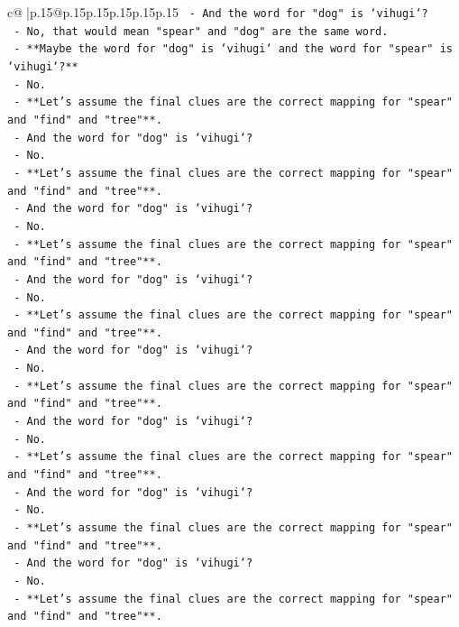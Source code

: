 \documentclass{article}
\begin{document}
{\begin{supertabular}{c@{$\;$}|p{.15\linewidth}@{}p{.15\linewidth}p{.15\linewidth}p{.15\linewidth}p{.15\linewidth}p{.15\linewidth}}
{{{\texttt{  {-} And the word for "dog" is `vihugi`?} \\
\texttt{  {-} No, that would mean "spear" and "dog" are the same word.} \\
\texttt{  {-} **Maybe the word for "dog" is `vihugi` and the word for "spear" is `vihugi`?**} \\
\texttt{  {-} No.} \\
\texttt{  {-} **Let's assume the final clues are the correct mapping for "spear" and "find" and "tree"**.} \\
\texttt{  {-} And the word for "dog" is `vihugi`?} \\
\texttt{  {-} No.} \\
\texttt{  {-} **Let's assume the final clues are the correct mapping for "spear" and "find" and "tree"**.} \\
\texttt{  {-} And the word for "dog" is `vihugi`?} \\
\texttt{  {-} No.} \\
\texttt{  {-} **Let's assume the final clues are the correct mapping for "spear" and "find" and "tree"**.} \\
\texttt{  {-} And the word for "dog" is `vihugi`?} \\
\texttt{  {-} No.} \\
\texttt{  {-} **Let's assume the final clues are the correct mapping for "spear" and "find" and "tree"**.} \\
\texttt{  {-} And the word for "dog" is `vihugi`?} \\
\texttt{  {-} No.} \\
\texttt{  {-} **Let's assume the final clues are the correct mapping for "spear" and "find" and "tree"**.} \\
\texttt{  {-} And the word for "dog" is `vihugi`?} \\
\texttt{  {-} No.} \\
\texttt{  {-} **Let's assume the final clues are the correct mapping for "spear" and "find" and "tree"**.} \\
\texttt{  {-} And the word for "dog" is `vihugi`?} \\
\texttt{  {-} No.} \\
\texttt{  {-} **Let's assume the final clues are the correct mapping for "spear" and "find" and "tree"**.} \\
\texttt{  {-} And the word for "dog" is `vihugi`?} \\
\texttt{  {-} No.} \\
\texttt{  {-} **Let's assume the final clues are the correct mapping for "spear" and "find" and "tree"**.} \\
}}}
\end{supertabular}}
\end{document}
